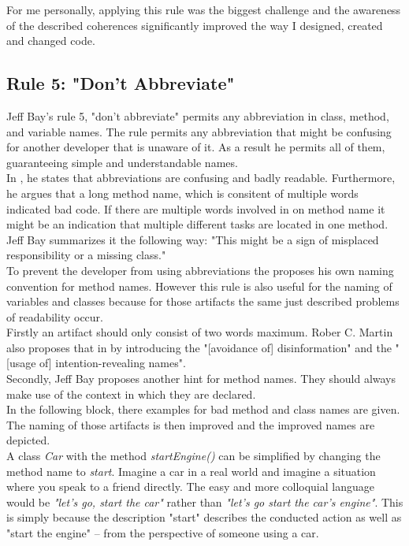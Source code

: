 For me personally, applying this rule was the biggest challenge and the awareness of the described coherences significantly improved the way I designed, created and changed code. 

\subsection*{Rule 5: "Don't Abbreviate"}
Jeff Bay's rule 5, "don't abbreviate" permits any abbreviation in class, method, and variable names. The rule permits any abbreviation that might be confusing for another developer that is unaware of it. As a result he permits all of them, guaranteeing simple and understandable names.
\\

In \cite{oc2008}, he states that abbreviations are confusing and badly readable. Furthermore, he argues that a long method name, which is consitent of multiple words indicated bad code. If there are multiple words involved in on method name it might be an indication that multiple different tasks are located in one method.  Jeff Bay summarizes it the following way: "This might be a sign of misplaced responsibility or a missing class." \cite{oc2008}
\\

To prevent the developer from using abbreviations the proposes his own naming convention for method names. However this rule is also useful for the naming of variables and classes because for those artifacts the same just described problems of readability occur.\\

Firstly an artifact should only consist of two words maximum. Rober C. Martin also proposes that in \cite[p. 19]{cc} by introducing the "[avoidance of] disinformation" and the "[usage of] intention-revealing names". 
\\

Secondly, Jeff Bay proposes another hint for method names. They should always make use of the context in which they are declared. 
\\

In the following block, there examples for bad method and class names are given. The naming of those artifacts is then improved and the improved names are depicted. 
\\

A class \textit{Car} with the method \textit{startEngine()} can be simplified by changing the method name to \textit{start}. Imagine a car in a real world and imagine a situation where you speak to a friend directly. The easy and more colloquial language would be \textit{"let's go, start the car"} rather than \textit{"let's go start the car's engine"}. This is simply because the description "start" describes the conducted action as well as "start the engine" -- from the perspective of someone using a car.\\

